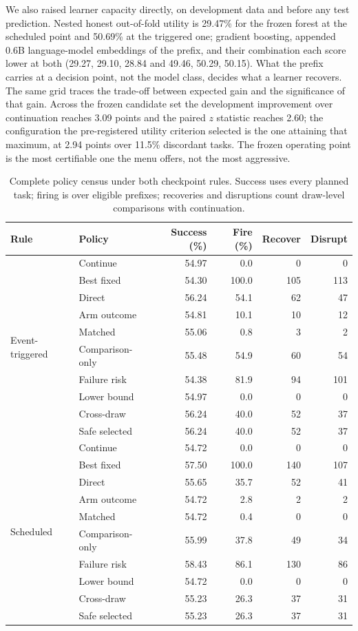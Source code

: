 We also raised learner capacity directly, on development data and before any test prediction. Nested honest out-of-fold utility is 29.47\% for the frozen forest at the scheduled point and 50.69\% at the triggered one; gradient boosting, appended 0.6B language-model embeddings of the prefix, and their combination each score lower at both (29.27, 29.10, 28.84 and 49.46, 50.29, 50.15). What the prefix carries at a decision point, not the model class, decides what a learner recovers. The same grid traces the trade-off between expected gain and the significance of that gain. Across the frozen candidate set the development improvement over continuation reaches 3.09 points and the paired $z$ statistic reaches 2.60; the configuration the pre-registered utility criterion selected is the one attaining that maximum, at 2.94 points over 11.5\% discordant tasks. The frozen operating point is the most certifiable one the menu offers, not the most aggressive.

\begin{table}[ht]
\caption{Complete policy census under both checkpoint rules. Success uses every planned task; firing is over eligible prefixes; recoveries and disruptions count draw-level comparisons with continuation.}
\label{tab:r2-policies}
\centering
\small
\begin{tabular}{@{}llrrrr@{}}
\toprule
Rule & Policy & Success (\%) & Fire (\%) & Recover & Disrupt \\
\midrule
\multirow{10}{*}{Event-triggered} & Continue & 54.97 & 0.0 & 0 & 0 \\
 & Best fixed & 54.30 & 100.0 & 105 & 113 \\
 & Direct & 56.24 & 54.1 & 62 & 47 \\
 & Arm outcome & 54.81 & 10.1 & 10 & 12 \\
 & Matched & 55.06 & 0.8 & 3 & 2 \\
 & Comparison-only & 55.48 & 54.9 & 60 & 54 \\
 & Failure risk & 54.38 & 81.9 & 94 & 101 \\
 & Lower bound & 54.97 & 0.0 & 0 & 0 \\
 & Cross-draw & 56.24 & 40.0 & 52 & 37 \\
 & Safe selected & 56.24 & 40.0 & 52 & 37 \\
\midrule
\multirow{10}{*}{Scheduled} & Continue & 54.72 & 0.0 & 0 & 0 \\
 & Best fixed & 57.50 & 100.0 & 140 & 107 \\
 & Direct & 55.65 & 35.7 & 52 & 41 \\
 & Arm outcome & 54.72 & 2.8 & 2 & 2 \\
 & Matched & 54.72 & 0.4 & 0 & 0 \\
 & Comparison-only & 55.99 & 37.8 & 49 & 34 \\
 & Failure risk & 58.43 & 86.1 & 130 & 86 \\
 & Lower bound & 54.72 & 0.0 & 0 & 0 \\
 & Cross-draw & 55.23 & 26.3 & 37 & 31 \\
 & Safe selected & 55.23 & 26.3 & 37 & 31 \\
\bottomrule
\end{tabular}
\end{table}

